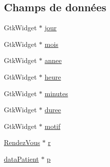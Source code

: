 \subsection*{Champs de données}
\begin{DoxyCompactItemize}
\item 
Gtk\-Widget $\ast$ \hyperlink{struct_data_r_d_v_a366c31a9b090d9870030fe2ac52d6e46}{jour}
\item 
Gtk\-Widget $\ast$ \hyperlink{struct_data_r_d_v_a430ab7341bb11cda80f096a2ec12d8d7}{mois}
\item 
Gtk\-Widget $\ast$ \hyperlink{struct_data_r_d_v_a123c0853fe0470eb0a0f0af055eecc9f}{annee}
\item 
Gtk\-Widget $\ast$ \hyperlink{struct_data_r_d_v_a4eb5541c2c8d07380c735d1603dc7ecb}{heure}
\item 
Gtk\-Widget $\ast$ \hyperlink{struct_data_r_d_v_a27524e2f658f644a11dbb3a8f9b5ab97}{minutes}
\item 
Gtk\-Widget $\ast$ \hyperlink{struct_data_r_d_v_a14f0b724f1decdb5bdad19079ec1d675}{duree}
\item 
Gtk\-Widget $\ast$ \hyperlink{struct_data_r_d_v_ae22ca5875ee8b6bdccaa89afda5779a4}{motif}
\item 
\hyperlink{struct_rendez_vous}{Rendez\-Vous} $\ast$ \hyperlink{struct_data_r_d_v_a017a2a103427c89eebac9921f00620ab}{r}
\item 
\hyperlink{callbacks_8h_aa29088b0ebf449924c098ffbc3fb8350}{data\-Patient} $\ast$ \hyperlink{struct_data_r_d_v_a537ec1a4e0cf2f81d81bf4da1a0a3f2f}{p}
\end{DoxyCompactItemize}


